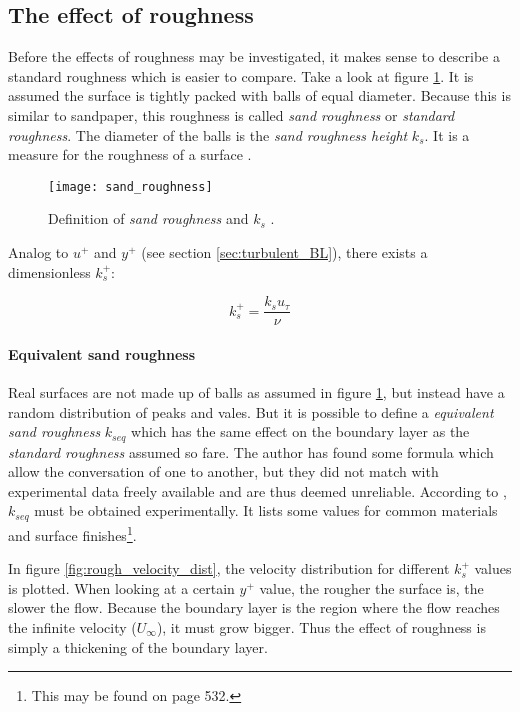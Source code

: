 \subsection{The effect of roughness}
Before the effects of roughness may be investigated, it makes sense to describe
a standard roughness which is easier to compare. Take a look at figure
\ref{fig:sand_roughness}. It is assumed the surface is tightly packed with balls
of equal diameter. Because this is similar to sandpaper, this roughness is
called \textit{sand roughness} or \textit{standard roughness}. The diameter of
the balls is the \textit{sand roughness height} $k_{s}$. It is a measure for the
roughness of a surface \cite{Schlichting2018}.

\begin{figure}[H] \centering
\texttt{[image: sand\_roughness]}
    \caption{Definition of \textit{sand roughness} and $k_{s}$ \cite{Schlichting2018}.}
    \label{fig:sand_roughness}
\end{figure}

\noindent Analog to $u^{+}$ and $y^{+}$ (see section \ref{sec:turbulent_BL}),
there exists a dimensionless $k_{s}^{+}$:

\begin{equation}
  k_{s}^{+} = \frac{k_{s}u_{\tau}}{\nu}
\end{equation}

\paragraph{Equivalent sand roughness}
Real surfaces are not made up of balls as assumed in figure
\ref{fig:sand_roughness}, but instead have a random distribution of peaks and
vales. But it is possible to define a \textit{equivalent sand roughness}
$k_{seq}$ which has the same effect on the boundary layer as the
\textit{standard roughness} assumed so fare. The author has found some formula
which allow the conversation of one to another, but they did not match with
experimental data freely available and are thus deemed unreliable. According to
\cite{Schlichting2018}, $k_{seq}$ must be obtained experimentally. It lists some
values for common materials and surface finishes\footnote{This may be found on
page 532.}.


In figure \ref{fig:rough_velocity_dist}, the velocity distribution for different
$k_{s}^{+}$ values is plotted. When looking at a certain $y^{+}$ value, the
rougher the surface is, the slower the flow. Because the boundary layer is the
region where the flow reaches the infinite velocity ($U_{\infty}$), it must grow
bigger. Thus the effect of roughness is simply a thickening of the boundary
layer.

